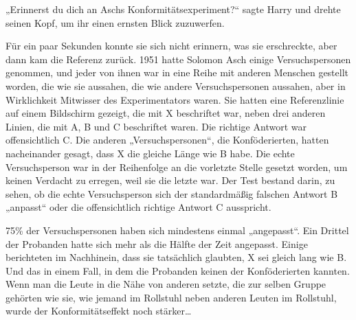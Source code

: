 „Erinnerst du dich an Aschs Konformitätsexperiment?“ sagte Harry und drehte seinen Kopf, um ihr einen ernsten Blick zuzuwerfen.

Für ein paar Sekunden konnte sie sich nicht erinnern, was sie erschreckte, aber dann kam die Referenz zurück.
1951 hatte Solomon Asch einige Versuchspersonen genommen, und jeder von ihnen war in eine Reihe mit anderen Menschen gestellt worden, die wie sie aussahen, die wie andere Versuchspersonen aussahen, aber in Wirklichkeit Mitwisser des Experimentators waren.
Sie hatten eine Referenzlinie auf einem Bildschirm gezeigt, die mit X beschriftet war, neben drei anderen Linien, die mit A, B und C beschriftet waren. Die richtige Antwort war offensichtlich C. Die anderen „Versuchspersonen“, die Konföderierten, hatten nacheinander gesagt, dass X die gleiche Länge wie B habe. Die echte Versuchsperson war in der Reihenfolge an die vorletzte Stelle gesetzt worden, um keinen Verdacht zu erregen, weil sie die letzte war. Der Test bestand darin, zu sehen, ob die echte Versuchsperson sich der standardmäßig falschen Antwort B „anpasst“ oder die offensichtlich richtige Antwort C ausspricht.

75\% der Versuchspersonen haben sich mindestens einmal „angepasst“.
Ein Drittel der Probanden hatte sich mehr als die Hälfte der Zeit angepasst.
Einige berichteten im Nachhinein, dass sie tatsächlich glaubten, X sei gleich lang wie B. Und das in einem Fall, in dem die Probanden keinen der Konföderierten kannten.
Wenn man die Leute in die Nähe von anderen setzte, die zur selben Gruppe gehörten wie sie, wie jemand im Rollstuhl neben anderen Leuten im Rollstuhl, wurde der Konformitätseffekt noch stärker…

